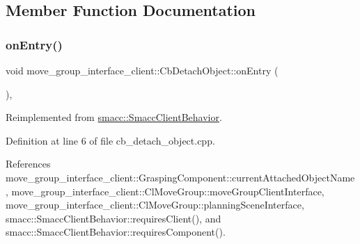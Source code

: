 \subsection{Member Function Documentation}
\mbox{\label{classmove__group__interface__client_1_1CbDetachObject_aaed049b8c346b38a82acb4641aa90df6}} 
\subsubsection{\texorpdfstring{on\+Entry()}{onEntry()}}
{\footnotesize\ttfamily void move\+\_\+group\+\_\+interface\+\_\+client\+::\+Cb\+Detach\+Object\+::on\+Entry (\begin{DoxyParamCaption}{ }\end{DoxyParamCaption})\hspace{0.3cm}{\ttfamily [override]}, {\ttfamily [virtual]}}



Reimplemented from \hyperlink{classsmacc_1_1SmaccClientBehavior_a7962382f93987c720ad432fef55b123f}{smacc\+::\+Smacc\+Client\+Behavior}.



Definition at line 6 of file cb\+\_\+detach\+\_\+object.\+cpp.



References move\+\_\+group\+\_\+interface\+\_\+client\+::\+Grasping\+Component\+::current\+Attached\+Object\+Name, move\+\_\+group\+\_\+interface\+\_\+client\+::\+Cl\+Move\+Group\+::move\+Group\+Client\+Interface, move\+\_\+group\+\_\+interface\+\_\+client\+::\+Cl\+Move\+Group\+::planning\+Scene\+Interface, smacc\+::\+Smacc\+Client\+Behavior\+::requires\+Client(), and smacc\+::\+Smacc\+Client\+Behavior\+::requires\+Component().


